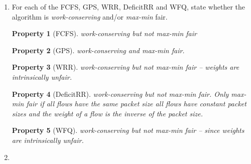 \documentclass[10pt,\jkfside,a4paper]{article}
\newtheorem{property}{Property}
\newcommand{\wcs}{\textit{work-conserving}\xspace}
\newcommand{\mm}{\textit{max-min}\xspace}
\begin{document}
\begin{enumerate}
    The \mm fair share criterion attempts interprets fairness as `every flow either gets everything it wants -- or no flow got more than it did'. This means that flow is shared equally between all flows, with the caveat that if some flows don't \textit{want} all that capacity, their unwanted capacity is split between the flows which \textit{do} want it.

    The formula is more complicated saying that each of $N$ flows should get $\frac1N$ of the bandwidth because such an allocation would waste bandwidth if flows did not want as much as $\frac1N$ of the capacity.

    \item For each of the FCFS, GPS, WRR, DeficitRR and WFQ, state whether the algorithm is \wcs and/or \mm fair.

    \begin{property}[FCFS]

        \wcs but not \mm fair

    \end{property}

    \begin{property}[GPS]

        \wcs and \mm fair.

    \end{property}

    \begin{property}[WRR]

        \wcs but not \mm fair -- weights are \textit{intrinsically unfair}.

    \end{property}

    \begin{property}[DeficitRR]

        \wcs but not \mm fair. Only \mm fair if all flows have the same packet size all flows have constant packet sizes and the weight of a flow is the inverse of the packet size.

    \end{property}

    \begin{property}[WFQ]

        \wcs but not \mm fair -- since weights are \textit{intrinsically unfair}.

    \end{property}

    \item

    \begin{enumerate}


\end{enumerate}
\end{enumerate}
\end{document}
